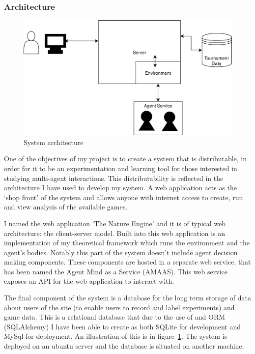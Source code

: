 \documentclass[]{final_report}
\begin{document}
\subsubsection{Architecture}
\begin{figure}
\vspace{-30pt}
\begin{framed}
	\begin{center}
	\includegraphics[width=\textwidth]{PresSystem.png}
	\caption{System architecture}
	\label{fig:architecture}
	\end{center}
\end{framed}
\vspace{-30pt}
\end{figure}
One of the objectives of my project is to create a system that is distributable, in order for it to be an experimentation and learning tool for those interested in studying multi-agent interactions. This distributability is reflected in the architecture I have used to develop my system. A web application acts as the `shop front' of the system and allows anyone with internet access to create, run and view analysis of the available games.\par 
I named the web application `The Nature Engine' and it is of typical web architecture: the client-server model. Built into this web application is an implementation of my theoretical framework which runs the environment and the agent's bodies. Notably this part of the system doesn't include agent decision making components. These components are hosted in a separate web service, that has been named the Agent Mind as a Service (AMAAS). This web service exposes an API for the web application to interact with.\par 
The final component of the system is a database for the long term storage of data about users of the site (to enable users to record and label experiments) and game data. This is a relational database that due to the use of and ORM (SQLAlchemy) I have been able to create as both SQLite for development and MySql for deployment. An illustration of this is in figure~\ref{fig:architecture}. The system is deployed on an ubuntu server and the database is situated on another machine.
\end{document}
